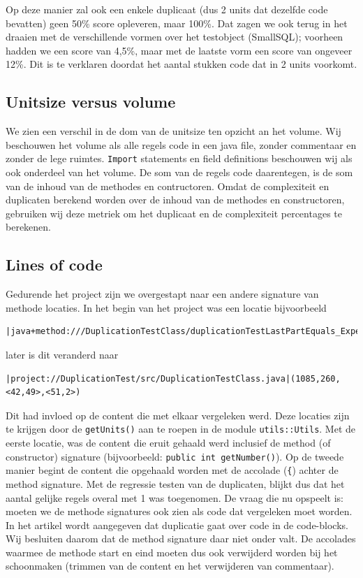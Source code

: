 \documentclass[a4paper]{article}
\begin{document}
Op deze manier zal ook een enkele duplicaat (dus 2 units dat dezelfde code bevatten) geen 50\% score opleveren, maar 100\%. Dat zagen we ook terug in het draaien met de verschillende vormen over het testobject (SmallSQL); voorheen hadden we een score van 4,5\%, maar met de laatste vorm een score van ongeveer 12\%. Dit is te verklaren doordat het aantal stukken code dat in 2 units voorkomt.

\subsection{Unitsize versus volume}
We zien een verschil in de dom van de unitsize ten opzicht an het volume. Wij beschouwen het volume als alle regels code in een java file, zonder commentaar en zonder de lege ruimtes. \texttt{Import} statements en field definitions beschouwen wij als ook onderdeel van het volume. De som van de regels code daarentegen, is de som van de inhoud van de methodes en contructoren. Omdat de complexiteit en duplicaten berekend worden over de inhoud van de methodes en constructoren, gebruiken wij deze metriek om het duplicaat en de complexiteit percentages te berekenen.

\subsection{Lines of code}
Gedurende het project zijn we 
overgestapt naar een andere
signature van methode locaties. 
In het begin van het project was
een locatie bijvoorbeeld
\begin{lstlisting}
|java+method:///DuplicationTestClass/duplicationTestLastPartEquals_ExpectTrue()|
\end{lstlisting}
later is dit veranderd naar
\begin{lstlisting}
|project://DuplicationTest/src/DuplicationTestClass.java|(1085,260,<42,49>,<51,2>)
\end{lstlisting}
Dit had invloed op de content die met elkaar vergeleken werd.
Deze locaties zijn te krijgen door de \texttt{getUnits()} aan te
roepen in de module \texttt{utils::Utils}. Met de eerste
locatie, was de content die eruit gehaald werd inclusief de
method (of constructor) signature (bijvoorbeeld: \texttt{public
int getNumber()}). Op de tweede manier begint de content die
opgehaald worden met de accolade (\texttt{\{}) achter de method
signature. Met de regressie testen van de duplicaten, blijkt dus
dat het aantal gelijke regels overal met 1 was toegenomen. De vraag die nu opspeelt is: moeten we de methode signatures ook zien als code dat vergeleken moet worden. In het artikel wordt aangegeven dat duplicatie gaat over code in de code-blocks. Wij besluiten daarom dat de method signature daar niet onder valt. De accolades waarmee de methode start en eind moeten dus ook verwijderd worden bij het schoonmaken (trimmen van de content en het verwijderen van commentaar).
\end{document}
